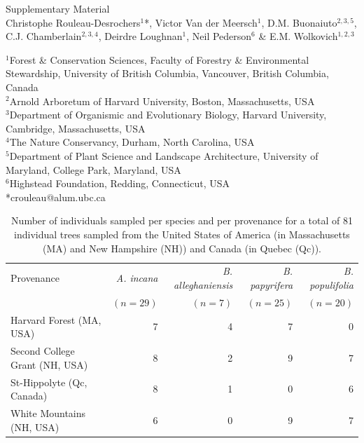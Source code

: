 \documentclass{article}\usepackage[]{graphicx}\usepackage[]{xcolor}
\begin{document}
\linenumbers
{}

\begin{center}
{\sc} {\Large Supplementary Material} \\
\vspace{5ex}
{\sc} Christophe Rouleau-Desrochers$^1$*, Victor Van der Meersch$^1$, D.M. Buonaiuto$^{2,3,5}$, C.J. Chamberlain$^{2,3,4}$, Deirdre Loughnan$^1$, Neil Pederson$^6$ \& E.M. Wolkovich$^{1,2,3}$
\end{center}
$^1$Forest \& Conservation Sciences, Faculty of Forestry \& Environmental Stewardship, University of British Columbia, Vancouver, British Columbia, Canada\\
$^2$Arnold Arboretum of Harvard University, Boston, Massachusetts, USA\\
$^3$Department of Organismic and Evolutionary Biology, Harvard University, Cambridge, Massachusetts, USA\\
$^4$The Nature Conservancy, Durham, North Carolina, USA\\
$^5$Department of Plant Science and Landscape Architecture, University of Maryland, College Park, Maryland, USA \\
$^6$Highstead Foundation, Redding, Connecticut, USA \\
*crouleau@alum.ubc.ca

\newcommand{\Ainc}{\textit{A. incana}}
\newcommand{\Ball}{\textit{B. alleghaniensis}}
\newcommand{\Bpap}{\textit{B. papyrifera}}
\newcommand{\Bpop}{\textit{B. populifolia}}




\setcounter{table}{0}
\renewcommand{\thetable}{S\arabic{table}}
\setcounter{figure}{0}
\renewcommand{\thefigure}{S\arabic{figure}}

\setlength{\tabcolsep}{3pt}
\begin{table}[ht]
\centering
\caption{Number of individuals sampled per species and per provenance for a total of 81 individual trees sampled from the United States of America (in Massachusetts (MA) and New Hampshire (NH)) and Canada (in Quebec (Qc)).} 
\label{tab:tab_species}
\begin{tabular}{lrrrr}
  \hline
Provenance & \textit{A. incana} & \textit{B. alleghaniensis} & \textit{B. papyrifera} & \textit{B. populifolia} \\
 & $(n = 29)$ & $(n = 7)$ & $(n = 25)$ & $(n = 20)$ \\
\hline
 \hline
  \hline
Harvard Forest (MA, USA) & 7 & 4 & 7 & 0 \\ 
  Second College Grant (NH, USA) & 8 & 2 & 9 & 7 \\ 
  St-Hippolyte (Qc, Canada) & 8 & 1 & 0 & 6 \\ 
  White Mountains (NH, USA) & 6 & 0 & 9 & 7 \\ 
   \hline
\end{tabular}
\end{table}
\end{document}

